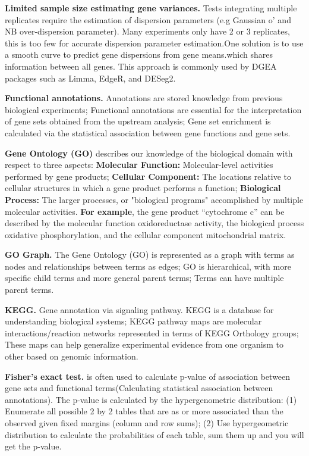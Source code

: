 \vspace{0.1em}\noindent
\textbf{Limited sample size estimating gene variances.} Tests integrating multiple replicates require the estimation of dispersion parameters (e.g Gaussian o' and NB over-dispersion parameter). Many experiments only have 2 or 3 replicates, this is too few for accurate dispersion parameter estimation.One solution is to use a smooth curve to predict gene dispersions from gene means.which shares information between all genes. This approach is commonly used by DGEA packages such as Limma, EdgeR, and DESeg2.

\vspace{0.1em}\noindent
\textbf{Functional annotations.} Annotations are stored knowledge from previous biological experiments; Functional annotations are essential for the interpretation of gene sets obtained from the upstream analysis; Gene set enrichment is calculated via the statistical association between gene functions and gene sets.

\vspace{0.1em}\noindent
\textbf{Gene Ontology (GO)} describes our knowledge of the biological domain with respect to three aspects: \textbf{Molecular Function:} Molecular-level activities performed by gene products; \textbf{Cellular Component:} The locations relative to cellular structures in which a gene product performs a function; \textbf{Biological Process:} The larger processes, or "biological programs" accomplished by multiple molecular activities.  \textbf{For example}, the gene product “cytochrome c” can be described by the molecular function oxidoreductase activity, the biological process oxidative phosphorylation, and the cellular component mitochondrial matrix.

\vspace{0.1em}\noindent
\textbf{GO Graph.} The Gene Ontology (GO) is represented as a graph with terms as nodes and relationships between terms as edges; GO is hierarchical, with more specific child terms and more general parent terms; Terms can have multiple parent terms.

\vspace{0.1em}\noindent
\textbf{KEGG.} Gene annotation via signaling pathway. KEGG is a database for understanding biological systems; KEGG pathway maps are molecular interactions/reaction networks represented in terms of KEGG Orthology groups; These maps can help generalize experimental evidence from one organism to other based on genomic information.

\vspace{0.1em}\noindent
\textbf{Fisher's exact test.} is often used to calculate p-value of association between gene sets and functional terms(Calculating statistical association between annotations). The p-value is calculated by the hypergenometric distribution: (1) Enumerate all possible 2 by 2 tables that are as or more associated than the observed given fixed margins (column and row sums); (2) Use hypergeometric distribution to calculate the probabilities of each table, sum them up and you will get the p-value.

